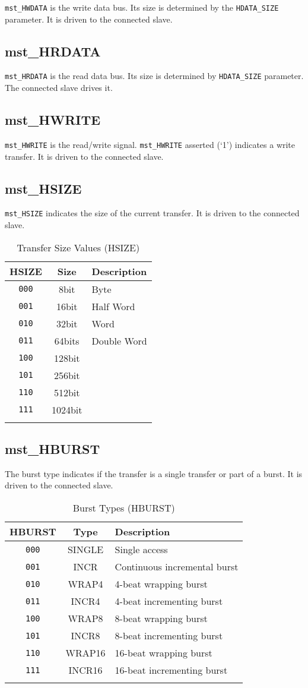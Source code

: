 \texttt{mst\_HWDATA} is the write data bus. Its size is determined by the
\texttt{HDATA\_SIZE} parameter. It is driven to the connected slave.

\subsection{mst\_HRDATA}\label{mst_hrdata}

\texttt{mst\_HRDATA} is the read data bus. Its size is determined by \texttt{HDATA\_SIZE}
parameter. The connected slave drives it.

\subsection{mst\_HWRITE}\label{mst_hwrite}

\texttt{mst\_HWRITE} is the read/write signal. \texttt{mst\_HWRITE} asserted (`1') indicates a
write transfer. It is driven to the connected slave.

\subsection{mst\_HSIZE}\label{mst_hsize}

\texttt{mst\_HSIZE} indicates the size of the current transfer. It is driven to
the connected slave.

\begin{longtable}[]{@{}ccl@{}}
\toprule
HSIZE & Size & Description\tabularnewline
\midrule
\endhead
\texttt{000} & 8bit    & Byte\tabularnewline
\texttt{001} & 16bit   & Half Word\tabularnewline
\texttt{010} & 32bit   & Word\tabularnewline
\texttt{011} & 64bits  & Double Word\tabularnewline
\texttt{100} & 128bit  & \tabularnewline
\texttt{101} & 256bit  & \tabularnewline
\texttt{110} & 512bit  & \tabularnewline
\texttt{111} & 1024bit & \tabularnewline
\bottomrule
\caption{Transfer Size Values (HSIZE)}
\end{longtable}


\subsection{mst\_HBURST}\label{mst_hburst}

The burst type indicates if the transfer is a single transfer or part of
a burst. It is driven to the connected slave.

\begin{longtable}[]{@{}ccl@{}}
\toprule
HBURST & Type & Description\tabularnewline
\midrule
\endhead
\texttt{000} & SINGLE & Single access\tabularnewline
\texttt{001} & INCR & Continuous incremental burst\tabularnewline
\texttt{010} & WRAP4 & 4-beat wrapping burst\tabularnewline
\texttt{011} & INCR4 & 4-beat incrementing burst\tabularnewline
\texttt{100} & WRAP8 & 8-beat wrapping burst\tabularnewline
\texttt{101} & INCR8 & 8-beat incrementing burst\tabularnewline
\texttt{110} & WRAP16 & 16-beat wrapping burst\tabularnewline
\texttt{111} & INCR16 & 16-beat incrementing burst\tabularnewline
\bottomrule
\caption{Burst Types (HBURST)}
\end{longtable}

